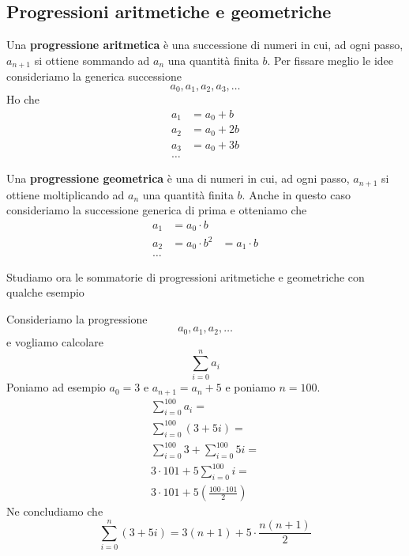 \subsection{Progressioni aritmetiche e geometriche}
\begin{defn}
	Una \textbf{progressione aritmetica} \`e una successione di numeri in cui, ad ogni passo,
	$a_{n + 1}$ si ottiene sommando ad $a_n$ una quantit\`a finita $b$.
	Per fissare meglio le idee consideriamo la generica successione
	\begin{equation*}
		a_0, a_1, a_2, a_3, \dots
	\end{equation*}
	Ho che
	\begin{equation*}
		\begin{array}{ll}
			a_1 & = a_0 + b  \\
			a_2 & = a_0 + 2b \\
			a_3 & = a_0 + 3b \\
			\dots
		\end{array}
	\end{equation*}
\end{defn}

\begin{defn}
	Una \textbf{progressione geometrica} \`e una di numeri in cui, ad ogni passo, $a_{n + 1}$
	si ottiene moltiplicando ad $a_n$ una quantit\`a finita $b$.
	Anche in questo caso consideriamo la successione generica di prima e otteniamo che
	\begin{equation*}
		\begin{array}{lll}
			a_1 & = a_0 \cdot b   &               \\
			a_2 & = a_0 \cdot b^2 & = a_1 \cdot b \\
			\dots
		\end{array}
	\end{equation*}
\end{defn}

Studiamo ora le sommatorie di progressioni aritmetiche e geometriche con qualche esempio
\begin{example}
	Consideriamo la progressione
	\begin{equation*}
		a_0, a_1, a_2, \dots
	\end{equation*}
	e vogliamo calcolare
	\begin{equation*}
		\sum_{i = 0}^n a_i
	\end{equation*}
	Poniamo ad esempio $a_0 = 3$ e $a_{n + 1} = a_n + 5$ e poniamo $n = 100$.
	\begin{gather*}
		\sum_{i = 0}^{100} a_i                        = \\
		\sum_{i = 0}^{100} (3 + 5i)                   = \\
		\sum_{i = 0}^{100} 3 + \sum_{i = 0}^{100} 5i  = \\
		3 \cdot 101 + 5 \sum_{i = 0}^{100} i          = \\
		3 \cdot 101 + 5 \left( \frac{100 \cdot 101}{2} \right)
	\end{gather*}
	Ne concludiamo che
	\begin{equation*}
		\sum_{i = 0}^n (3 + 5i) = 3(n + 1) + 5 \cdot \frac{n(n + 1)}{2}
	\end{equation*}
\end{example}

